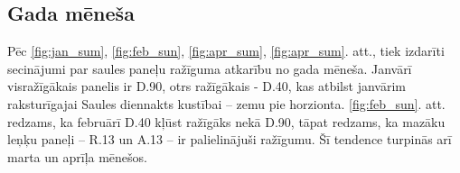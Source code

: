 




\subsection{Gada mēneša} \label{subsection:gads}
Pēc \ref{fig:jan_sum}, \ref{fig:feb_sun}, \ref{fig:apr_sum}, \ref{fig:apr_sum}. att., tiek izdarīti secinājumi par saules paneļu ražīguma atkarību no gada mēneša. Janvārī visražīgākais panelis ir D.90, otrs ražīgākais - D.40, kas atbilst janvārim raksturīgajai Saules diennakts kustībai -- zemu pie horzionta. \ref{fig:feb_sun}. att. redzams, ka februārī D.40 kļūst ražīgāks nekā D.90, tāpat redzams, ka mazāku leņķu paneļi -- R.13 un A.13 -- ir palielinājuši ražīgumu. Šī tendence turpinās arī marta un aprīļa mēnešos.

